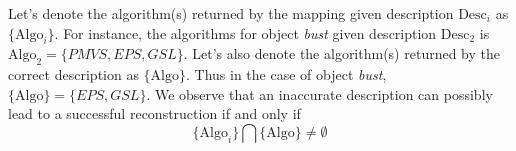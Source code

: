

Let's denote the algorithm(s) returned by the mapping given description $\text{Desc}_i$ as $\{\text{Algo}_i\}$. For instance, the algorithms for object \textit{bust} given description $\text{Desc}_2$ is $\text{Algo}_2=\{PMVS, EPS, GSL\}$. Let's also denote the algorithm(s) returned by the correct description as $\{\text{Algo}\}$. Thus in the case of object \textit{bust}, $\{\text{Algo}\}=\{EPS, GSL\}$. We observe that an inaccurate description can possibly lead to a successful reconstruction if and only if 
$$
\{\text{Algo}_i\} \bigcap \{\text{Algo}\} \neq \emptyset
$$

